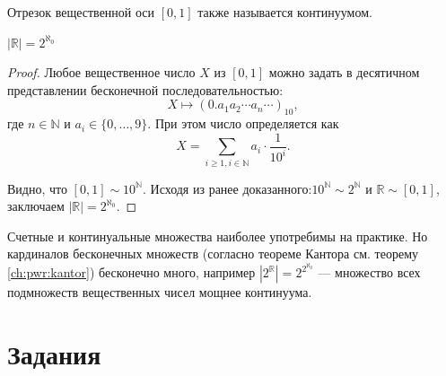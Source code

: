 Отрезок вещественной оси $[0,1]$ также называется континуумом.

\begin{Theor}
    $|\mathbb{R}|=2^{\aleph_0}$
\end{Theor}
\begin{proof}
    Любое вещественное число $X$ из $[0,1]$ можно задать в десятичном представлении бесконечной последовательностью:
    \[
        X\mapsto(0.a_1a_2\cdots a_n\cdots)_{10},
    \]
    где $n\in\mathbb{N}$ и $a_i\in\{0,\ldots,9\}$. При этом число определяется как
    \[
        X=\sum_{i\geq 1,i\in\mathbb{N}}a_i\cdot \frac{1}{10^i}.
    \]
    
    Видно, что $[0,1]\sim 10^\mathbb{N}$. Исходя из ранее доказанного:$10^\mathbb{N}\sim 2^\mathbb{N}$ и $\mathbb{R}\sim[0,1]$, заключаем $|\mathbb{R}|=2^{\aleph_0}$.
\end{proof}

Счетные и континуальные множества наиболее употребимы на практике. Но кардиналов бесконечных множеств (согласно теореме Кантора см. теорему \ref{ch:pwr:kantor}) бесконечно много, например $|2^\mathbb{R}|=2^{2^{\aleph_0}}$ --- множество всех подмножеств вещественных чисел мощнее континуума.


\section*{Задания}

